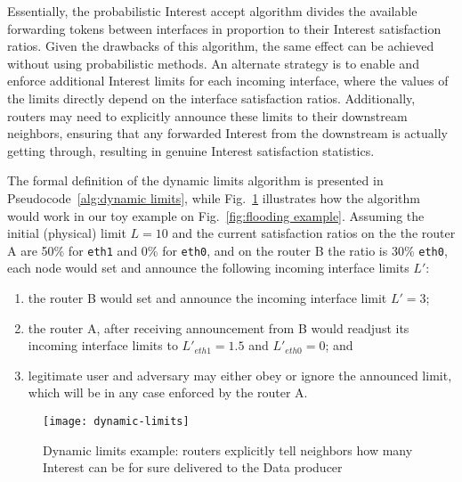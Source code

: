 

Essentially, the probabilistic Interest accept algorithm divides the available forwarding tokens between interfaces in proportion to their Interest satisfaction ratios.
Given the drawbacks of this algorithm, the same effect can be achieved without using probabilistic methods. An alternate strategy is to enable and enforce additional Interest limits for each incoming interface, where the values of the limits directly depend on the interface satisfaction ratios.
Additionally, routers may need to explicitly announce these limits to their downstream neighbors, ensuring that any forwarded Interest from the downstream is actually getting through, resulting in genuine Interest satisfaction statistics.

The formal definition of the dynamic limits algorithm is presented in Pseudocode~\ref{alg:dynamic limits}, while Fig.~\ref{fig:dynamic limits example} illustrates how the algorithm would work in our toy example on Fig.~\ref{fig:flooding example}.
Assuming the initial (physical) limit $L=10$ and the current satisfaction ratios on the the router A are 50\% for \texttt{eth1} and 0\% for \texttt{eth0}, and on the router B the ratio is 30\%  \texttt{eth0}, each node would set and announce the following  incoming interface limits $L'$: 
\begin{enumerate}
\item the router B would set and announce the incoming interface limit $L'=3$;
\item the router A, after receiving announcement from B would readjust its incoming interface limits to $L'_{eth1} = 1.5$ and $L'_{eth0} = 0$; and
\item legitimate user and adversary may either obey or ignore the announced limit, which will be in any case enforced by the router A.
\end{enumerate}


\begin{figure}[htbp]
  \centering
  \texttt{[image: dynamic-limits]}
  \caption{Dynamic limits example: routers explicitly tell neighbors how many Interest can be for sure delivered to the Data producer}
  \label{fig:dynamic limits example}
\end{figure}




